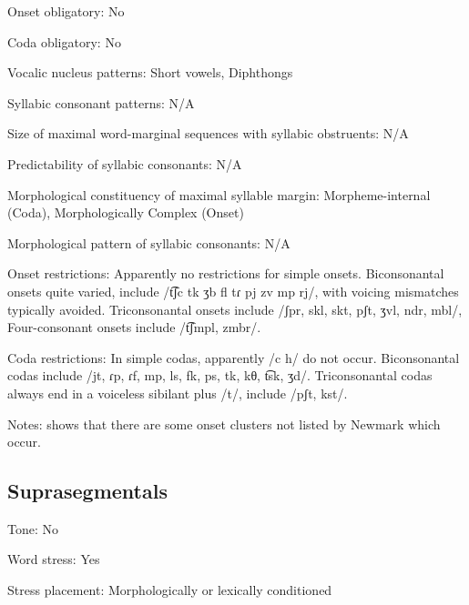 {\begin{appendixdesc}
\item[Onset obligatory:] No

\item[Coda obligatory:] No

\item[Vocalic nucleus patterns:] Short vowels, Diphthongs

\item[Syllabic consonant patterns:] N/A

\item[Size of maximal word-marginal sequences with syllabic obstruents:] N/A

\item[Predictability of syllabic consonants:] N/A

\item[Morphological constituency of maximal syllable margin:] Morpheme-internal (Coda), Morphologically Complex (Onset)

\item[Morphological pattern of syllabic consonants:] N/A

\item[Onset restrictions:] Apparently no restrictions for simple onsets. Biconsonantal onsets quite varied, include /t͡ʃc tk ʒb fl tɾ pj zv mp rj/, with voicing mismatches typically avoided. Triconsonantal onsets include /ʃpr, skl, skt, pʃt, ʒvl, ndr, mbl/, Four-consonant onsets include /t͡ʃmpl, zmbr/.

\item[Coda restrictions:] In simple codas, apparently /c h/ do not occur. Biconsonantal codas include /jt, ɾp, ɾf, mp, ls, fk, ps, tk,  kθ, t͡sk, ʒd/. Triconsonantal codas always end in a voiceless sibilant plus /t/, include /pʃt, kst/.

\item[Notes:] \citet{Klippenstein2010} shows that there are some onset clusters not listed by Newmark which occur.
\end{appendixdesc}
\subsection*{Suprasegmentals}
\begin{appendixdesc}
\item[Tone:] No

\item[Word stress:] Yes

\item[Stress placement:] Morphologically or lexically conditioned


\end{appendixdesc}}

